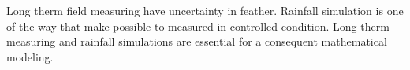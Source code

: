 

\newline
Long therm field measuring have uncertainty in feather. Rainfall simulation is one of the way that make possible to measured in controlled condition. 
\newline
Long-therm measuring and rainfall simulations are essential for a consequent mathematical modeling. 




